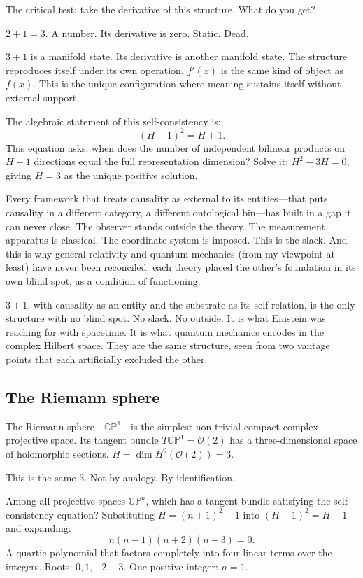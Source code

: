 \documentclass[11pt,a4paper]{article}
\theoremstyle{definition}
\theoremstyle{remark}
\newcommand{\CP}{\mathbb{CP}}
\begin{document}
The critical test: take the derivative of this structure. What do you get?

$2+1=3$. A number. Its derivative is zero. Static. Dead.

$3+1$ is a manifold state. Its derivative is another manifold state. The structure reproduces itself under its own operation. $f'(x)$ is the same kind of object as $f(x)$. This is the unique configuration where meaning sustains itself without external support.

The algebraic statement of this self-consistency is:
\[
(H-1)^2=H+1.
\]
This equation asks: when does the number of independent bilinear products on $H-1$ directions equal the full representation dimension? Solve it: $H^2-3H=0$, giving $H=3$ as the unique positive solution.

Every framework that treats causality as external to its entities---that puts causality in a different category, a different ontological bin---has built in a gap it can never close. The observer stands outside the theory. The measurement apparatus is classical. The coordinate system is imposed. This is the slack. And this is why general relativity and quantum mechanics (from my viewpoint at least) have never been reconciled: each theory placed the other's foundation in its own blind spot, as a condition of functioning.

$3+1$, with causality as an entity and the substrate as its self-relation, is the only structure with no blind spot. No slack. No outside. It is what Einstein was reaching for with spacetime. It is what quantum mechanics encodes in the complex Hilbert space. They are the same structure, seen from two vantage points that each artificially excluded the other.

\subsection*{The Riemann sphere}

The Riemann sphere---$\CP^1$---is the simplest non-trivial compact complex projective space. Its tangent bundle $T\CP^1=\mathcal{O}(2)$ has a three-dimensional space of holomorphic sections. $H=\dim H^0(\mathcal{O}(2))=3$.

This is the same $3$. Not by analogy. By identification.

Among all projective spaces $\CP^n$, which has a tangent bundle satisfying the self-consistency equation? Substituting $H=(n+1)^2-1$ into $(H-1)^2=H+1$ and expanding:
\[
n(n-1)(n+2)(n+3)=0.
\]
A quartic polynomial that factors completely into four linear terms over the integers. Roots: $0,1,-2,-3$. One positive integer: $n=1$.
\end{document}
